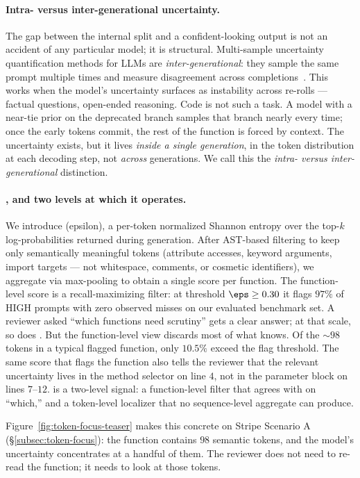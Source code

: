 \paragraph{Intra- versus inter-generational uncertainty.}
The gap between the internal split and a confident-looking output
is not an accident of any particular model; it is structural.
Multi-sample uncertainty quantification methods for LLMs are
\emph{inter-generational}: they sample the same prompt multiple
times and measure disagreement across completions~\cite{kuhn2023semantic,%
uqlm2024,sharma2025multisample}. This works when the model's
uncertainty surfaces as instability across re-rolls --- factual
questions, open-ended reasoning. Code is not such a task. A model
with a near-tie prior on the deprecated branch samples that branch
nearly every time; once the early tokens commit, the rest of the
function is forced by context. The uncertainty exists, but it
lives \emph{inside a single generation}, in the token distribution at
each decoding step, not \emph{across} generations. We call this the
\emph{intra- versus inter-generational} distinction.

\paragraph{\eps, and two levels at which it operates.}
We introduce \eps (epsilon), a per-token normalized Shannon entropy
over the top-$k$ log-probabilities returned during generation. After
AST-based filtering to keep only semantically meaningful tokens
(attribute accesses, keyword arguments, import targets --- not
whitespace, comments, or cosmetic identifiers), we aggregate via
max-pooling to obtain a single score per function. The function-level
score is a recall-maximizing filter: at threshold $\eps \ge 0.30$ it
flags $97\%$ of HIGH prompts with zero observed misses on
our evaluated benchmark set. A reviewer asked ``which functions need scrutiny''
gets a clear answer; at that scale, so does \papg. But the
function-level view discards most of what \eps knows. Of the
$\sim 98$ tokens in a typical flagged function, only $10.5\%$ exceed
the flag threshold. The same score that flags the function also tells
the reviewer that the relevant uncertainty lives in the method
selector on line $4$, not in the parameter block on lines $7$--$12$.
\eps is a two-level signal: a function-level filter that agrees with
\papg on ``which,'' and a token-level localizer that no sequence-level
aggregate can produce.

Figure~\ref{fig:token-focus-teaser} makes this concrete on Stripe
Scenario A (\S\ref{subsec:token-focus}): the function contains $98$
semantic tokens, and the model's uncertainty concentrates at a
handful of them. The reviewer does not need to re-read the function;
it needs to look at those tokens.

